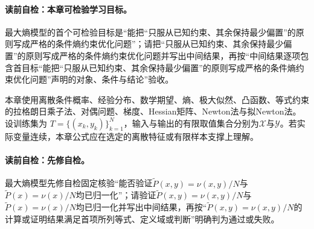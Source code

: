\paragraph{读前自检：本章可检验学习目标。}最大熵模型的首个可检验目标是“能把“只服从已知约束、其余保持最少偏置”的原则写成严格的条件熵约束优化问题”；请把“只服从已知约束、其余保持最少偏置”的原则写成严格的条件熵约束优化问题并写出中间结果，再按“中间结果逐项包含首目标“能把“只服从已知约束、其余保持最少偏置”的原则写成严格的条件熵约束优化问题”声明的对象、条件与结论”验收。\par


\label{struct:V3-C01-CH02}
\begin{prerequisitebox}
本章使用离散条件概率、经验分布、数学期望、熵、极大似然、凸函数、等式约束的拉格朗日乘子法、对偶问题、梯度、Hessian矩阵、Newton法与拟Newton法。设训练集为
$T=\{(x_k,y_k)\}_{k=1}^{N}$，输入与输出的有限取值集合分别为$\mathcal X$与$\mathcal Y$。若实际变量连续，本章公式应在选定的离散特征或有限样本支撑上理解。
\end{prerequisitebox}

\label{struct:V3-C01-CH03}
\paragraph{读前自检：先修自检。}最大熵模型先修自检固定核验“能否验证$\widetilde P(x,y)=\nu(x,y)/N$与$\widetilde P(x)=\nu(x)/N$均已归一化”；请验证$\widetilde P(x,y)=\nu(x,y)/N$与$\widetilde P(x)=\nu(x)/N$均已归一化并写出中间结果，再按“$\widetilde P(x,y)=\nu(x,y)/N$的计算或证明结果满足首项所列等式、定义域或判断”明确判为通过或失败。\par


